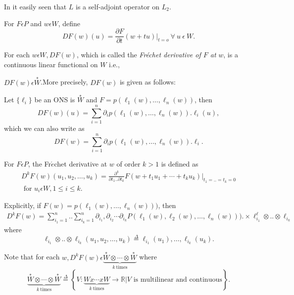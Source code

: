 In it easily seen that $L$ is a self-adjoint operator on $L_2$.

\begin{definition}%
For $F \epsilon  P$ and $w \epsilon  W$, define
$$
DF (w) (u) = \frac{\partial F}{\partial t} (w + tu)|_{t = o} ~\forall~
u~ \epsilon ~ W. 
$$
\end{definition}

For each $w \epsilon  W, DF(w)$, which is called the
\textit{Fr\'echet derivative of $F$ at} $w$, is a continuous
linear functional on $W$ i.e.,   

$DF(w)\epsilon  \overset{\ast}{W}$.\pageoriginale More precisely,
$DF(w)$ is given as follows:  

Let $\{\ell_i\}$ be an ONS is $\overset{\ast}{W}$ and $F = p (\ell_1
(w),\ldots, \ell_n (w))$, then 
$$
DF(w) (u) = \sum_{i = 1}^{n} \partial_i p (\ell_1 (w),\ldots,
\ell_n(w)). \ell_i(u), 
$$
which we can also write as
$$
DF(w)  = \sum_{i = 1}^{n} \partial_i p (\ell_1 (w),\ldots, \ell_n(w)). \ell_i.
$$

For $F \epsilon  P$, the Fr$\acute{e}$chet derivative at $w$ of
order $k > 1$ is defined as  
\begin{gather*}
  D^kF(w) (u_1,u_2, \ldots, u_k)= \frac{\partial^k}{\partial t_1
  .. \partial t_k } F (w +t_1 u_1 + \cdots + t_k u_k)|_{t_1 = .. = t_k
  = 0}\\ 
  \text{ for } u_i \epsilon  W, 1 \le i \le k. 
\end{gather*}

Explicitly, if $F(w) = p (\ell_1(w), \ldots, \ell_n (w)))$, then
{\fontsize{10pt}{12pt}\selectfont
\begin{gather*}
  D^k F(w) = \sum^{n}_{i_1 = 1} .. \sum^{n}_{i_k = 1} \partial_{i_1},
  \partial_{i_2} \cdots \partial_{i_k} P(\ell_1(w), \ell_2(w), \ldots,
  \ell_n (w))). \times \ell^{\ell}_{i_1} \otimes .. \otimes \ell_{i_k}
\end{gather*}}\relax
where
$$
\ell_{i_1} \otimes .. \otimes \ell_{i_k} (u_1, u_2, \ldots, u_k)
\overset{\Delta}= \ell_{i_1} (u_1),\ldots, \ell_{i_k} (u_k). 
$$

Note that for each $w, D^k F (w) \epsilon  
\underbrace{\overset{\ast}{W} \otimes \cdots \otimes \overset{\ast}{W}}_{k ~\text{times}}$
where
$$
\underbrace{\overset{\ast}{W} \otimes \cdots \otimes \overset{\ast}{W}}_{k ~\text{times}} \overset{\Delta}= \left\{V: 
    \underbrace{W x \cdots x W}_{k ~\text{times}} \to \mathbb{R} | V \text{ is
  multilinear and continuous}\right\}. 
$$

